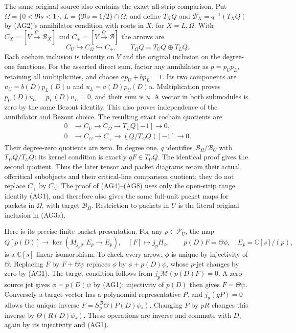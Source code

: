 The same original source also contains the exact all-strip comparison.
Put $\Omega=\{0<\Re s<1\}$, $L=\{\Re s=1/2\}\cap\Omega$,
and define $T_XQ$ and $\mathscr B_X=q^{-1}(T_XQ)$ by (AG2)'s
annihilator condition with roots in $X$, for $X=L,\Omega$.
With $C_X=[V\xrightarrow{\Theta}\mathscr B_X]$ and
$C_+=[V\xrightarrow{\Theta}\mathscr B]$ the arrows are
\[
 C_U\hookrightarrow C_\Omega\hookrightarrow C_+,
 \qquad T_\Omega Q=T_UQ\oplus T_LQ.                    \tag{AG3a}
\]
Each cochain inclusion is identity on $V$ and the original inclusion
on the degree-one functions. For the asserted direct sum, factor any
annihilator as $p=p_Up_L$, retaining all multiplicities, and choose
$a p_U+b p_L=1$. Its two components are
$u_U=b(D)p_L(D)u$ and $u_L=a(D)p_U(D)u$. Multiplication proves
$p_U(D)u_U=p_L(D)u_L=0$, and their sum is $u$. A vector in both
submodules is zero by the same Bezout identity. This also proves
independence of the annihilator and Bezout choice.
The resulting exact cochain quotients are
\[
\begin{split}
 0&\to C_U\to C_\Omega\to T_LQ[-1]\to0,\\
 0&\to C_\Omega\to C_+\to(Q/T_\Omega Q)[-1]\to0.
\end{split}                                                   \tag{AG3b}
\]
Their degree-zero quotients are zero. In degree one, $q$ identifies
$\mathscr B_\Omega/\mathscr B_U$ with $T_\Omega Q/T_UQ$:
its kernel condition is exactly $qF\in T_UQ$. The identical proof
gives the second quotient. Thus the later tensor and packet diagrams
retain their actual offcritical subobjects and their critical-line
comparison quotient; they do not replace $C_+$ by $C_U$.
The proof of (AG4)--(AG8) uses only the open-strip range identity
(AG1), and therefore also gives the same full-unit packet maps for
packets in $\Omega$, with target $\mathscr B_\Omega$. Restriction
to packets in $U$ is the literal original inclusion in (AG3a).

Here is its precise finite-packet presentation.  For any $p\in
\mathcal P_U$, the map
\[
 Q[p(D)]\longrightarrow\ker(M_{j_pg}:E_p\to E_p),\quad
 [F]\longmapsto j_pH_\phi,
 \qquad p(D)F=\Theta\phi,
 \quad E_p=\mathbb C[s]/(p),
 \tag{AG4}
\]
is a $\mathbb C[s]$-linear isomorphism.  To check every arrow,
$\phi$ is unique by injectivity of $\Theta$.  Replacing $F$ by
$F+\Theta\psi$ replaces $\phi$ by $\phi+p(D)\psi$, whose
$p$-jet changes by zero by (AG1).  The target condition follows from
$j_p\mathcal M(p(D)F)=0$.  A zero source jet gives
$\phi=p(D)\psi$ by (AG1); injectivity of $p(D)$ then gives
$F=\Theta\psi$.  Conversely a target vector has a polynomial
representative $P$, and $j_p(gP)=0$ allows the unique inverse
$F=S_p^{\mathscr B}\Theta(P(D)\phi_*)$.  Changing $P$ by $pR$
changes this inverse by $\Theta(R(D)\phi_*)$.  These operations
are inverse and commute with $D$, again by its injectivity and (AG1).

